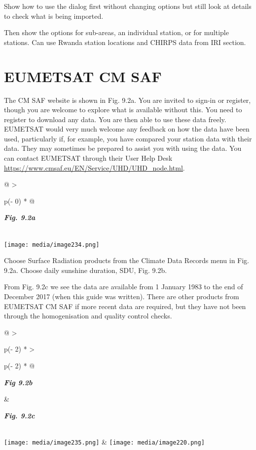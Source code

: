 \documentclass[
  letterpaper,
  DIV=11,
  numbers=noendperiod]{scrreprt}
\begin{document}
Show how to use the dialog first without changing options but still look
at details to check what is being imported.

Then show the options for sub-areas, an individual station, or for
multiple stations. Can use Rwanda station locations and CHIRPS data from
IRI section.

\section{EUMETSAT CM SAF}\label{eumetsat-cm-saf}

The CM SAF website is shown in Fig. 9.2a. You are invited to sign-in or
register, though you are welcome to explore what is available without
this. You need to register to download any data. You are then able to
use these data freely. EUMETSAT would very much welcome any feedback on
how the data have been used, particularly if, for example, you have
compared your station data with their data. They may sometimes be
prepared to assist you with using the data. You can contact EUMETSAT
through their User Help Desk
\href{https://www.cmsaf.eu/EN/Service/UHD/UHD_node.html}{\ul{https://www.cmsaf.eu/EN/Service/UHD/UHD\_node.html}}.

\begin{longtable}[]{@{}
  >{\raggedright\arraybackslash}p{(\columnwidth - 0\tabcolsep) * }@{}}
\toprule\noalign{}
\begin{minipage}[b]{\linewidth}\raggedright
\textbf{\emph{Fig. 9.2a}}
\end{minipage} \\
\midrule\noalign{}
\endhead
\bottomrule\noalign{}
\endlastfoot
\texttt{[image: media/image234.png]} \\
\end{longtable}

Choose Surface Radiation products from the Climate Data Records menu in
Fig. 9.2a. Choose daily sunshine duration, SDU, Fig. 9.2b.

From Fig. 9.2c we see the data are available from 1 January 1983 to the
end of December 2017 (when this guide was written). There are other
products from EUMETSAT CM SAF if more recent data are required, but they
have not been through the homogenisation and quality control checks.

\begin{longtable}[]{@{}
  >{\raggedright\arraybackslash}p{(\columnwidth - 2\tabcolsep) * }
  >{\raggedright\arraybackslash}p{(\columnwidth - 2\tabcolsep) * }@{}}
\toprule\noalign{}
\begin{minipage}[b]{\linewidth}\raggedright
\textbf{\emph{Fig 9.2b}}
\end{minipage} & \begin{minipage}[b]{\linewidth}\raggedright
\textbf{\emph{Fig. 9.2c}}
\end{minipage} \\
\midrule\noalign{}
\endhead
\bottomrule\noalign{}
\endlastfoot
\texttt{[image: media/image235.png]} &
\texttt{[image: media/image220.png]} \\
\end{longtable}
\end{document}
